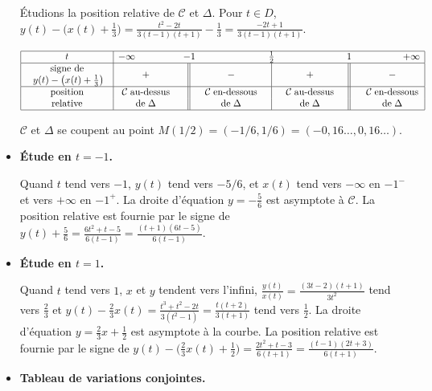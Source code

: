 \documentclass[class=report,crop=false]{standalone}
\begin{document}
\begin{exemple}
\begin{itemize}
Étudions la position relative de $\mathcal{C}$ et $\Delta$.
Pour $t\in D$, $y(t)-\big(x(t)+\frac{1}{3}\big)=\frac{t^2-2t}{3(t-1)(t+1)}-\frac{1}{3}
=\frac{-2t+1}{3(t-1)(t+1)}$.

{\scriptsize
$$\begin{array}{|c|cr||lcr|lcr||lc|}
\hline
t&-\infty\qquad\qquad &\multicolumn{2}{c}{-1}& &\multicolumn{2}{c}{\frac12}& &\multicolumn{2}{c}{1}& \qquad\qquad+\infty\\
\hline
\begin{array}{c}\text{signe de}\\\;y(t)-\big(x(t)+\frac{1}{3}\big)\end{array}& +& & &-& & &+& & &- \\
\hline
\text{position}& \mathcal{C}\;\text{au-dessus}& & &\mathcal{C}\;\text{en-dessous}& & &\mathcal{C}\;\text{au-dessus}& & &\mathcal{C}\;\text{en-dessous} \\
\text{relative}& \text{de}\;\Delta& & &\text{de}\;\Delta& & &\text{de}\;\Delta& & &\text{de}\;\Delta \\
\hline
\end{array}
$$
}

$\mathcal{C}$ et $\Delta$ se coupent au point $M(1/2)=(-1/6,1/6)=(-0,16\ldots,0,16\ldots)$.


  \item \textbf{Étude en $t=-1$.}

  Quand $t$ tend vers $-1$, $y(t)$ tend vers $-5/6$, et $x(t)$ tend vers $-\infty$ en $-1^-$
et vers $+\infty$ en $-1^+$. La
droite d'équation $y=-\frac{5}{6}$ est asymptote à $\mathcal{C}$.
La position relative est fournie par le signe de
$y(t)+\frac{5}{6}=\frac{6t^2+t-5}{6(t-1)} = \frac{(t+1)(6t-5)}{6(t-1)}$.


 \item \textbf{Étude en $t=1$.}

 Quand $t$ tend vers $1$, $x$ et $y$ tendent vers l'infini, $\frac{y(t)}{x(t)}
=\frac{(3t-2)(t+1)}{3t^2}$ tend vers $\frac{2}{3}$ et
$y(t)-\frac{2}{3}x(t)=\frac{t^3+t^2-2t}{3(t^2-1)}=\frac{t(t+2)}{3(t+1)}$
tend vers $\frac{1}{2}$. La droite d'équation
$y=\frac{2}{3}x+\frac{1}{2}$ est asymptote à la courbe.
La position relative est fournie par le signe de
$y(t)-\big(\frac{2}{3}x(t)+\frac{1}{2}\big)
=\frac{2t^2+t-3}{6(t+1)} = \frac{(t-1)(2t+3)}{6(t+1)}$.

  \item \textbf{Tableau de variations conjointes.}





\end{itemize}
\end{exemple}
\end{document}
